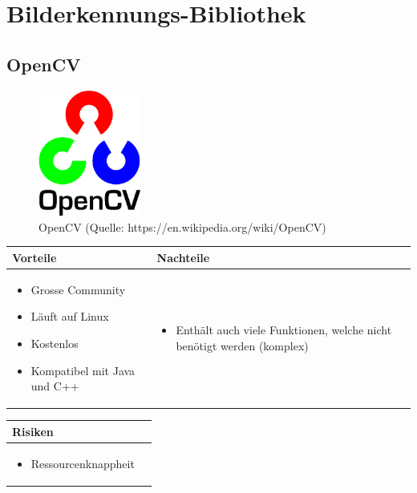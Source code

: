 
\section{Bilderkennungs-Bibliothek}


\subsection{OpenCV}

\begin{figure}[h!]%
\centering
\includegraphics[width=0.3\textwidth]{fig/opencv.png}
\caption{OpenCV (Quelle: https://en.wikipedia.org/wiki/OpenCV)}
\label{fig:OpenCV}
\end{figure}

\begin{table}[h]
\begin{tabular}{p{} | p{}}



 \textbf{Vorteile} & \textbf{Nachteile} \\ \hline
	 
\begin{itemize}
\item Grosse Community
\item Läuft auf Linux
\item Kostenlos
\item Kompatibel mit Java und C++
\end{itemize}

 
 &
 
\begin{itemize}
\item Enthält auch viele Funktionen, welche nicht benötigt werden (komplex)
\end{itemize}

\end{tabular}
\end{table}

\begin{table}[h]
\begin{tabular}{p{}p{}}


 \textbf{Risiken} & \\ \hline
	 
\begin{itemize}
\item Ressourcenknappheit
\end{itemize}

 
\end{tabular}
\end{table}

